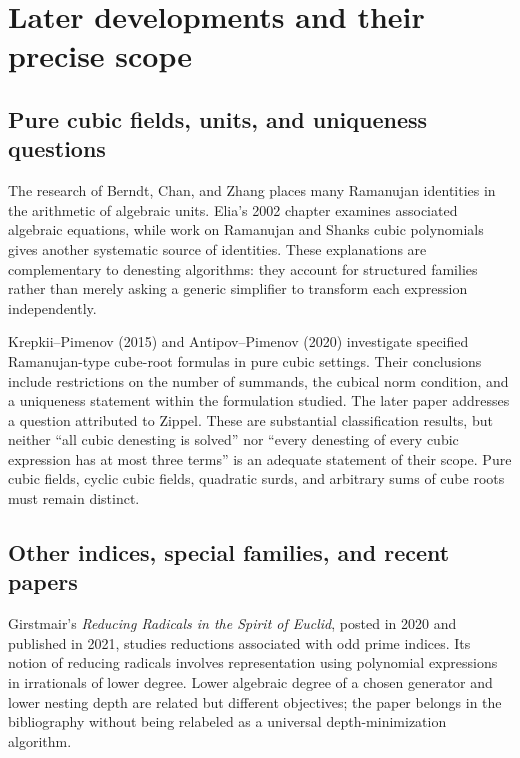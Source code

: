 \documentclass[11pt,a4paper]{article}
\theoremstyle{definition}
\theoremstyle{remark}
\numberwithin{equation}{section}
\begin{document}
\section{Later developments and their precise scope}
\label{sec:later}

\subsection{Pure cubic fields, units, and uniqueness questions}

The research of Berndt, Chan, and Zhang places many Ramanujan identities in the arithmetic of algebraic units. Elia's 2002 chapter examines associated algebraic equations, while work on Ramanujan and Shanks cubic polynomials gives another systematic source of identities. These explanations are complementary to denesting algorithms: they account for structured families rather than merely asking a generic simplifier to transform each expression independently.\cite{berndtchan1997,berndtchan1998,elia,barbero}

Krepkii--Pimenov (2015) and Antipov--Pimenov (2020) investigate specified Ramanujan-type cube-root formulas in pure cubic settings. Their conclusions include restrictions on the number of summands, the cubical norm condition, and a uniqueness statement within the formulation studied. The later paper addresses a question attributed to Zippel. These are substantial classification results, but neither ``all cubic denesting is solved'' nor ``every denesting of every cubic expression has at most three terms'' is an adequate statement of their scope. Pure cubic fields, cyclic cubic fields, quadratic surds, and arbitrary sums of cube roots must remain distinct.\cite{krepkii,antipov}

\subsection{Other indices, special families, and recent papers}

Girstmair's \emph{Reducing Radicals in the Spirit of Euclid}, posted in 2020 and published in 2021, studies reductions associated with odd prime indices. Its notion of reducing radicals involves representation using polynomial expressions in irrationals of lower degree. Lower algebraic degree of a chosen generator and lower nesting depth are related but different objectives; the paper belongs in the bibliography without being relabeled as a universal depth-minimization algorithm.\cite{girstmair}
\end{document}
